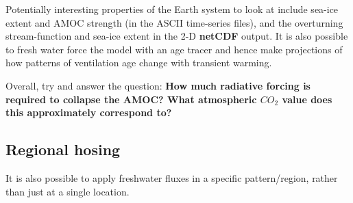 Potentially interesting properties of the Earth system to look at include sea-ice extent and AMOC strength (in the ASCII time-series files), and the overturning stream-function and sea-ice extent in the 2-D \textbf{netCDF} output. It is also possible to fresh water force the model with an age tracer and hence make projections of how patterns of ventilation age change with transient warming.

Overall, try and answer the question: \textbf{How much radiative forcing is required to collapse the AMOC? What atmospheric \(CO_{2}\) value does this approximately correspond to?}


\subsection{Regional hosing}

\noindent It is also possible to apply freshwater fluxes in a specific pattern/region, rather than just at a single location.

